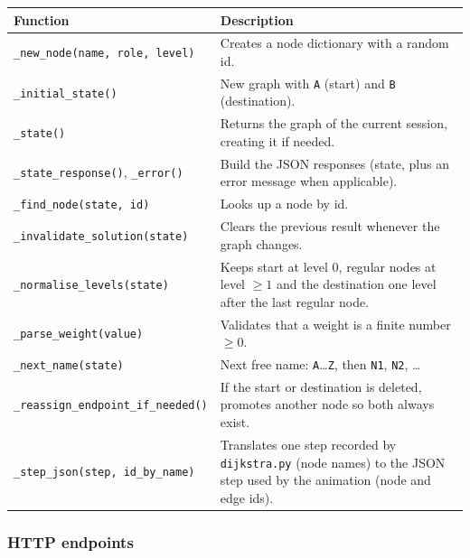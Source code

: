 \documentclass[11pt,letterpaper]{article}
\newcommand{\code}[1]{\texttt{#1}}
\begin{document}
\begin{tabularx}{\textwidth}{>{\raggedright\arraybackslash}p{5.2cm}L}
\toprule
\textbf{Function} & \textbf{Description} \\
\midrule
\code{\_new\_node(name, role, level)} & Creates a node dictionary with a random id. \\
\code{\_initial\_state()} & New graph with \code{A} (start) and \code{B} (destination). \\
\code{\_state()} & Returns the graph of the current session, creating it if needed. \\
\code{\_state\_response()}, \code{\_error()} & Build the JSON responses (state, plus an error message when applicable). \\
\code{\_find\_node(state, id)} & Looks up a node by id. \\
\code{\_invalidate\_solution(state)} & Clears the previous result whenever the graph changes. \\
\code{\_normalise\_levels(state)} & Keeps start at level 0, regular nodes at level $\ge 1$ and the destination one level after the last regular node. \\
\code{\_parse\_weight(value)} & Validates that a weight is a finite number $\ge 0$. \\
\code{\_next\_name(state)} & Next free name: \code{A}\ldots\code{Z}, then \code{N1}, \code{N2}, \ldots \\
\code{\_reassign\_endpoint\_}\allowbreak\code{if\_needed()} & If the start or destination is deleted, promotes another node so both always exist. \\
\code{\_step\_json(step, id\_by\_name)} & Translates one step recorded by \code{dijkstra.py} (node names) to the JSON step used by the animation (node and edge ids). \\
\bottomrule
\end{tabularx}

\subsubsection*{HTTP endpoints}
\end{document}
